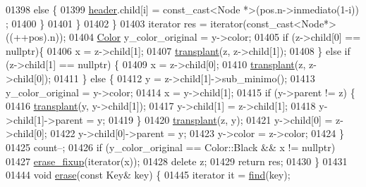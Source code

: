\begin{DoxyCode}
01398                 \textcolor{keywordflow}{else} \{
01399                     \hyperlink{classaed2_1_1map_a92d93f905c8ad73fba18fdc7e8915cce_a92d93f905c8ad73fba18fdc7e8915cce}{header}.child[i] = \textcolor{keyword}{const\_cast<}Node *\textcolor{keyword}{>}(pos.n->inmediato(1-i))
      ;
01400                 \}
01401             \}
01402         \}
01403         iterator res = iterator(const\_cast<Node*>((++pos).n));
01404         \hyperlink{classaed2_1_1map_a6d62a415a4b9d320b30cada4ebcf9f5b_a6d62a415a4b9d320b30cada4ebcf9f5b}{Color} y\_color\_original = y->color;
01405         \textcolor{keywordflow}{if} (z->child[0] == \textcolor{keyword}{nullptr})\{
01406             x = z->child[1];
01407             \hyperlink{classaed2_1_1map_a98b9f200c64ce02dfb67902ee00e375a_a98b9f200c64ce02dfb67902ee00e375a}{transplant}(z, z->child[1]);
01408         \} \textcolor{keywordflow}{else} \textcolor{keywordflow}{if} (z->child[1] == \textcolor{keyword}{nullptr}) \{
01409             x = z->child[0];
01410             \hyperlink{classaed2_1_1map_a98b9f200c64ce02dfb67902ee00e375a_a98b9f200c64ce02dfb67902ee00e375a}{transplant}(z, z->child[0]);
01411         \} \textcolor{keywordflow}{else} \{
01412             y = z->child[1]->sub\_minimo();
01413             y\_color\_original = y->color;
01414             x = y->child[1];
01415             \textcolor{keywordflow}{if} (y->parent != z) \{
01416                 \hyperlink{classaed2_1_1map_a98b9f200c64ce02dfb67902ee00e375a_a98b9f200c64ce02dfb67902ee00e375a}{transplant}(y, y->child[1]);
01417                 y->child[1] = z->child[1];
01418                 y->child[1]->parent = y;
01419             \}
01420             \hyperlink{classaed2_1_1map_a98b9f200c64ce02dfb67902ee00e375a_a98b9f200c64ce02dfb67902ee00e375a}{transplant}(z, y);
01421             y->child[0] = z->child[0];
01422             y->child[0]->parent = y;
01423             y->color = z->color;
01424         \}
01425         count--;
01426         \textcolor{keywordflow}{if} (y\_color\_original == Color::Black && x != \textcolor{keyword}{nullptr})
01427             \hyperlink{classaed2_1_1map_a7870c8f26e82b00d0aeb2e9f331dfec6_a7870c8f26e82b00d0aeb2e9f331dfec6}{erase_fixup}(iterator(x));
01428         \textcolor{keyword}{delete} z;
01429         \textcolor{keywordflow}{return} res;
01430     \}
01431 
01444     \textcolor{keywordtype}{void} \hyperlink{classaed2_1_1map_ad8e796bf9c9c558e5ce6b61e116253fe_ad8e796bf9c9c558e5ce6b61e116253fe}{erase}(\textcolor{keyword}{const} Key& key) \{
01445         iterator it = \hyperlink{classaed2_1_1map_afd0fc1a8234888e61e0e615de7e245b8_afd0fc1a8234888e61e0e615de7e245b8}{find}(key);

\end{DoxyCode}
